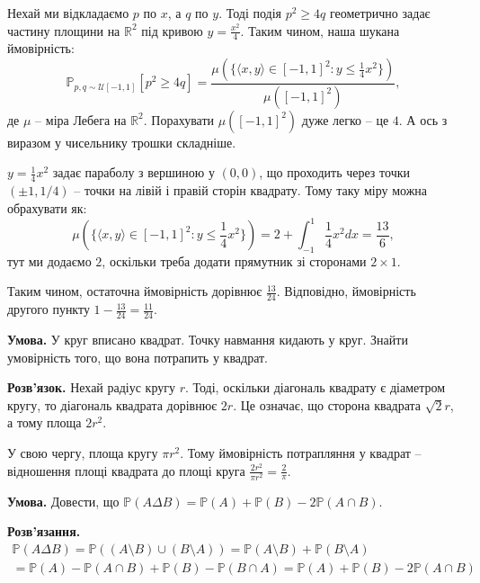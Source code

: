 \documentclass[oneside,solution]{karazin-prob-theory-assign}
\begin{document}
Нехай ми відкладаємо $p$ по $x$, а $q$ по $y$. Тоді подія $p^2 \geq 4q$ геометрично задає частину площини на $\mathbb{R}^2$ під кривою $y = \frac{x^2}{4}$. Таким чином, наша шукана ймовірність:
\begin{equation}
    \mathbb{P}_{p,q \sim \mathcal{U}[-1,1]}\left[p^2 \geq 4q\right] = \frac{\mu(\{\langle x, y \rangle \in [-1,1]^2: y \leq \frac{1}{4}x^2\})}{\mu([-1,1]^2)},
\end{equation}
де $\mu$ -- міра Лебега на $\mathbb{R}^2$. Порахувати $\mu([-1,1]^2)$ дуже легко -- це $4$. А ось з виразом у чисельнику трошки складніше. 

$y=\frac{1}{4}x^2$ задає параболу з вершиною у $(0,0)$, що проходить через точки $(\pm 1, 1/4)$ -- точки на лівій і правій сторін квадрату. Тому таку міру можна обрахувати як:
\begin{equation}
    \mu(\{\langle x, y \rangle \in [-1,1]^2: y \leq \frac{1}{4}x^2\}) = 2 + \int_{-1}^1 \frac{1}{4}x^2dx = \frac{13}{6},
\end{equation}
тут ми додаємо $2$, оскільки треба додати прямутник зі сторонами $2 \times 1$.

Таким чином, остаточна ймовірність дорівнює $\boxed{\frac{13}{24}}$. Відповідно, ймовірність другого пункту $1-\frac{13}{24}=\boxed{\frac{11}{24}}$. 


\hspace{20px}\textbf{Умова.} У круг вписано квадрат. Точку навмання кидають у круг. Знайти умовірність того, що вона потрапить у квадрат.

\textbf{Розв'язок.} Нехай радіус кругу $r$. Тоді, оскільки діагональ квадрату є діаметром кругу, то діагональ квадрата дорівнює $2r$. Це означає, що сторона квадрата $\sqrt{2}r$, а тому площа $2r^2$.

У свою чергу, площа кругу $\pi r^2$. Тому ймовірність потрапляння у квадрат -- відношення площі квадрата до площі круга $\frac{2r^2}{\pi r^2} = \boxed{\frac{2}{\pi}}$.


\hspace{20px}\textbf{Умова.} Довести, що $\mathbb{P}(A \Delta B)=\mathbb{P}(A)+\mathbb{P}(B)-2\mathbb{P}(A\cap B)$.

\textbf{Розв'язання.} 
\begin{gather}
    \mathbb{P}(A \Delta B) = \mathbb{P}((A \setminus B) \cup (B \setminus A)) = \mathbb{P}(A \setminus B) + \mathbb{P}(B \setminus A) \nonumber \\
    = \mathbb{P}(A) - \mathbb{P}(A \cap B) + \mathbb{P}(B) - \mathbb{P}(B \cap A) = \mathbb{P}(A)+\mathbb{P}(B)-2\mathbb{P}(A \cap B)
\end{gather}
\end{document}
